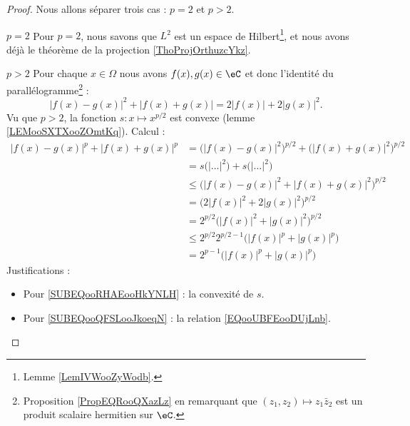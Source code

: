\begin{proof}
    Nous allons séparer trois cas : \( p=2\) et \( p>2\).
    \begin{subproof}
        \item[\( p=2\)]
            Pour \( p=2\), nous savons que \( L^2\) est un espace de Hilbert\footnote{Lemme \ref{LemIVWooZyWodb}.}, et nous avons déjà le théorème de la projection \ref{ThoProjOrthuzcYkz}.
        \item[\( p>2\)]
            Pour chaque \( x\in \Omega\) nous avons \( f(x), g(x)\in \eC\) et donc l'identité du parallélogramme\footnote{Proposition \ref{PropEQRooQXazLz} en remarquant que $(z_1,z_2)\mapsto z_1\bar z_2$ est un produit scalaire hermitien sur $\eC$.} :
            \begin{equation}        \label{EQooUBFEooDUjLnb}
                \big| f(x)-g(x) \big|^2+\big| f(x)+g(x) \big|=2| f(x) |+2| g(x) |^2.
            \end{equation}
            Vu que \( p>2\), la fonction \( s\colon x\mapsto  x^{p/2}\) est convexe (lemme \ref{LEMooSXTXooZOmtKq}). Calcul :
            \begin{subequations}
                \begin{align}
                    | f(x)-g(x) |^p+| f(x)+g(x) |^p&=\big( | f(x)-g(x) |^2 \big)^{p/2}+\big( | f(x)+g(x) |^2 \big)^{p/2}\\
                    &=s\big( | \ldots |^2 \big)+s\big( | \ldots |^2 \big)\\
                    &\leq \big( | f(x)-g(x) |^2+| f(x)+g(x) |^2 \big)^{p/2}     \label{SUBEQooRHAEooHkYNLH}\\
                    &=\big( 2| f(x) |^2+2| g(x) |^2 \big)^{p/2}                 \label{SUBEQooQFSLooJkoeqN}\\
                    &=2^{p/2}\big( | f(x) |^2+| g(x) |^2 \big)^{p/2}\\
                    &\leq  2^{p/2}2^{p/2-1}\big( | f(x) |^p+| g(x) |^p \big)     \label{SUBEQooQSUHooXKaWwO}\\
                    &=2^{p-1}\big( | f(x) |^p+| g(x) |^p \big)    
                \end{align}
            \end{subequations} 
            Justifications : 
            \begin{itemize}
                \item Pour \eqref{SUBEQooRHAEooHkYNLH} : la convexité de \( s\).
                \item Pour \eqref{SUBEQooQFSLooJkoeqN} : la relation \eqref{EQooUBFEooDUjLnb}.

\end{itemize}
\end{subproof}
\end{proof}
